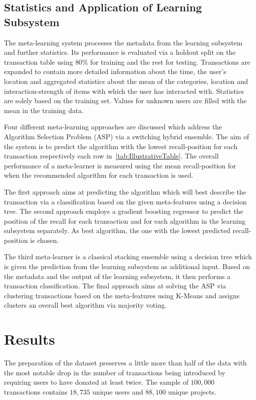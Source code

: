 \documentclass[runningheads]{llncs}
\begin{document}
\subsection{Statistics and Application of Learning Subsystem}
The meta-learning system processes the metadata from the learning subsystem and further statistics. Its performance is evaluated via a holdout split on the transaction table using $80\%$ for training and the rest for testing. Transactions are expanded to contain more detailed information about the time, the user's location and aggregated statistics about the mean of the categories, location and interaction-strength of items with which the user has interacted with. Statistics are solely based on the training set. Values for unknown users are filled with the mean in the training data.

Four different meta-learning approaches are discussed which address the Algorithm Selection Problem (ASP) via a switching hybrid ensemble. The aim of the system is to predict the algorithm with the lowest recall-position for each transaction respectively each row in~\autoref{tab:IllustrativeTable}. The overall performance of a meta-learner is measured using the mean recall-position for when the recommended algorithm for each transaction is used.

The first approach aims at predicting the algorithm which will best describe the transaction via a classification based on the given meta-features using a decision tree. The second approach employs a gradient boosting regressor to predict the position of the recall for each transaction and for each algorithm in the learning subsystem separately. As best algorithm, the one with the lowest predicted recall-position is chosen.

The third meta-learner is a classical stacking ensemble using a decision tree which is given the prediction from the learning subsystem as additional input. Based on the metadata and the output of the learning subsystem, it then performs a transaction classification. The final approach aims at solving the ASP via clustering transactions based on the meta-features using K-Means and assigns clusters an overall best algorithm via majority voting.

\section{Results}
The preparation of the dataset preserves a little more than half of the data with the most notable drop in the number of transactions being introduced by requiring users to have donated at least twice. The sample of $100,000$ transactions contains $18,735$ unique users and $88,100$ unique projects.
\end{document}
